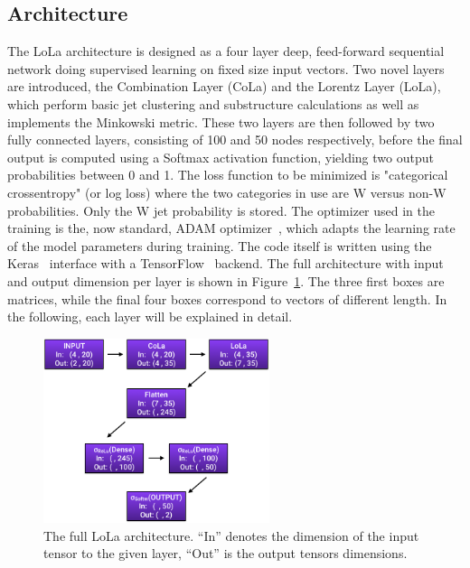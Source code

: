 \subsection{Architecture}
The LoLa architecture is designed as a four layer deep, feed-forward sequential network doing supervised learning on fixed size input vectors.
Two novel layers are introduced, the Combination Layer (CoLa) and the Lorentz Layer (LoLa), which perform basic jet clustering and substructure calculations as well as implements the Minkowski metric.
These two layers are then followed by two fully connected layers, consisting of 100 and 50 nodes respectively, before the final output is computed using a Softmax activation function, yielding two output probabilities between 0 and 1. The loss function to be minimized is "categorical crossentropy" (or log loss) where the two categories in use are W versus non-W probabilities. Only the W jet probability is stored.
The optimizer used in the training is the, now standard, ADAM optimizer~\cite{DBLP:journals/corr/KingmaB14}, which adapts the learning rate of the model parameters during training. The code itself is written using the Keras~\cite{chollet2015keras} interface with a TensorFlow~\cite{tensorflow2015-whitepaper} backend.
The full architecture with input and output dimension per layer is shown in Figure~\ref{fig:lola:arch}. The three first boxes are matrices, while the final four boxes correspond to vectors of different length. In the following, each layer will be explained in detail.
\begin{figure}[h!]
\centering
\includegraphics[width=0.59\textwidth]{figures/vtagging/misc/architecture.png}
\caption{The full LoLa architecture. ``In'' denotes the dimension of the input tensor to the given layer, ``Out'' is the output tensors dimensions.}
\label{fig:lola:arch}
\end{figure}


